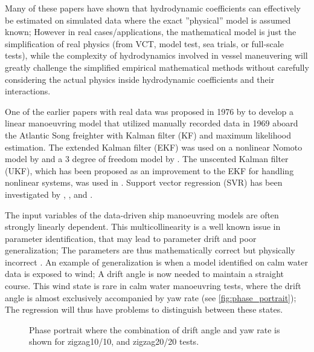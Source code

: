 Many of these papers have shown that hydrodynamic coefficients can effectively be estimated on simulated data where the exact ''physical'' model is assumed known; However in real cases/applications, the mathematical model is just the simplification of real physics (from VCT, model test, sea trials, or full-scale tests), while the complexity of hydrodynamics involved in vessel maneuvering will greatly challenge the simplified empirical mathematical methods without carefully considering the actual physics inside hydrodynamic coefficients and their interactions. 

One of the earlier papers with real data was proposed in 1976 by \citet{astrom_identification_1976} to develop a linear manoeuvring model that utilized manually recorded data in 1969 aboard the Atlantic Song freighter with Kalman filter (KF) and maximum likelihood estimation. 
The extended Kalman filter (EKF) was used on a nonlinear Nomoto model by \citet{perera_system_2015} and a 3 degree of freedom model by \citet{shi_identification_2009}. The unscented Kalman filter (UKF), which has been proposed as an improvement to the EKF for handling nonlinear systems, was used in \citet{revestido_herrero_two-step_2012}.
Support vector regression (SVR) has been investigated by \citet{luo_parameter_2016}, \citet{zhu_parameter_2017}, and \citet{wang_parameter_2021}. 

%
The input variables of the data-driven ship manoeuvring models are often strongly linearly dependent. This multicollinearity is a well known issue in parameter identification, that may lead to parameter drift and poor generalization; The parameters are thus mathematically correct but physically incorrect \citep{luo_parameter_2016}. 
An example of generalization is when a model identified on calm water data is exposed to wind; A drift angle is now needed to maintain a straight course. This wind state is rare in calm water manoeuvring tests, where the drift angle is almost exclusively accompanied by yaw rate (see \autoref{fig:phase_portrait}); 
The regression will thus have problems to distinguish between these states.
%
\begin{figure}[h]
    \centering
    
    \caption{Phase portrait where the combination of drift angle and yaw rate is shown for zigzag10/10, and zigzag20/20 tests.}
    \label{fig:phase_portrait}
\end{figure}
%

